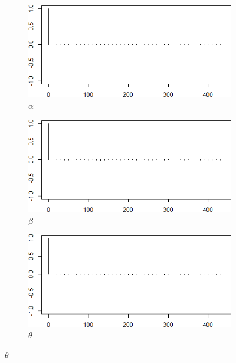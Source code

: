 \documentclass{Class/julia}
\begin{document}
\begin{figure}[!ht]
    \centering
    \caption{Autocorrelation Plots After Thinning (\texttt{itamtplcost})}
    \label{fig:14}
    \begin{subfigure}{0.45\textwidth}
        \centering
        \includegraphics[width=\textwidth]{itamtplcost/acf_after_thinning_alpha.png}
        \caption{\( \alpha \)}
    \end{subfigure}
    \hfill
    \begin{subfigure}{0.45\textwidth}
        \centering
        \includegraphics[width=\textwidth]{itamtplcost/acf_after_thinning_beta.png}
        \caption{\( \beta \)}
    \end{subfigure}

    \vspace{1em}

    \begin{subfigure}{0.45\textwidth}
        \centering
        \includegraphics[width=\textwidth]{itamtplcost/acf_after_thinning_theta.png}
        \caption{\( \theta \)}
    \end{subfigure}

\end{figure}
\end{document}
